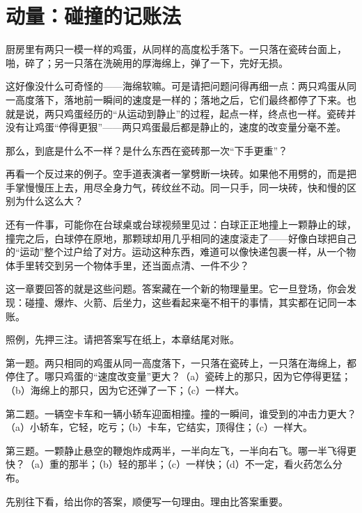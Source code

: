 \chapter{动量：碰撞的记账法}


\begin{mainline}
厨房里有两只一模一样的鸡蛋，从同样的高度松手落下。一只落在瓷砖台面上，啪，碎了；另一只落在洗碗用的厚海绵上，弹了一下，完好无损。

这好像没什么可奇怪的——海绵软嘛。可是请把问题问得再细一点：两只鸡蛋从同一高度落下，落地前一瞬间的速度是一样的；落地之后，它们最终都停了下来。也就是说，两只鸡蛋经历的“从运动到静止”的过程，起点一样，终点也一样。瓷砖并没有让鸡蛋“停得更狠”——两只鸡蛋最后都是静止的，速度的改变量分毫不差。

那么，到底是什么不一样？是什么东西在瓷砖那一次“下手更重”？

再看一个反过来的例子。空手道表演者一掌劈断一块砖。如果他不用劈的，而是把手掌慢慢压上去，用尽全身力气，砖纹丝不动。同一只手，同一块砖，快和慢的区别为什么这么大？

还有一件事，可能你在台球桌或台球视频里见过：白球正正地撞上一颗静止的球，撞完之后，白球停在原地，那颗球却用几乎相同的速度滚走了——好像白球把自己的“运动”整个过户给了对方。运动这种东西，难道可以像快递包裹一样，从一个物体手里转交到另一个物体手里，还当面点清、一件不少？

这一章要回答的就是这些问题。答案藏在一个新的物理量里。它一旦登场，你会发现：碰撞、爆炸、火箭、后坐力，这些看起来毫不相干的事情，其实都在记同一本账。
\end{mainline}


照例，先押三注。请把答案写在纸上，本章结尾对账。

第一题。两只相同的鸡蛋从同一高度落下，一只落在瓷砖上，一只落在海绵上，都停住了。哪只鸡蛋的“速度改变量”更大？（a）瓷砖上的那只，因为它停得更猛；（b）海绵上的那只，因为它还弹了一下；（c）一样大。

第二题。一辆空卡车和一辆小轿车迎面相撞。撞的一瞬间，谁受到的冲击力更大？（a）小轿车，它轻，吃亏；（b）卡车，它结实，顶得住；（c）一样大。

第三题。一颗静止悬空的鞭炮炸成两半，一半向左飞，一半向右飞。哪一半飞得更快？（a）重的那半；（b）轻的那半；（c）一样快；（d）不一定，看火药怎么分布。

先别往下看，给出你的答案，顺便写一句理由。理由比答案重要。


